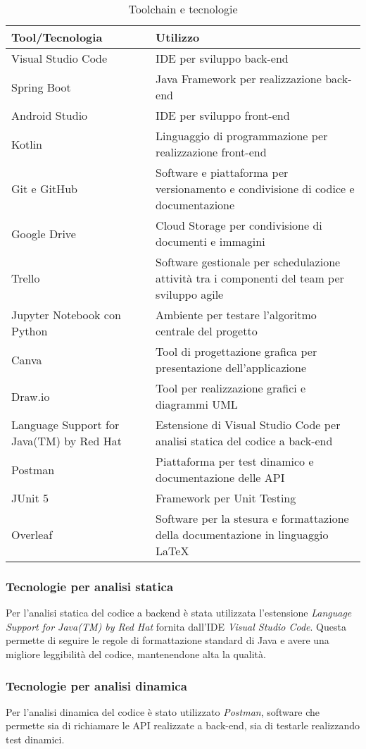 \begin{table}[htbp]
 \centering
 \begin{tabularx}{\textwidth}{| >{\raggedright\arraybackslash}X | >{\raggedright\arraybackslash}X |} 
 \hline
 \textbf{Tool/Tecnologia} & \textbf{Utilizzo} \\ [0.5ex]
 \hline\hline
Visual Studio Code & IDE per sviluppo back-end \\
\hline
Spring Boot & Java Framework per realizzazione back-end\\
\hline
Android Studio & IDE per sviluppo front-end \\
\hline
Kotlin & Linguaggio di programmazione per realizzazione front-end \\
\hline
Git e GitHub & Software e piattaforma per versionamento e condivisione di codice e documentazione \\
\hline
Google Drive & Cloud Storage per condivisione di documenti e immagini \\
\hline
Trello & Software gestionale per schedulazione attività tra i componenti del team per sviluppo agile\\
\hline
Jupyter Notebook con Python & Ambiente per testare l'algoritmo centrale del progetto\\
\hline
Canva & Tool di progettazione grafica per presentazione dell'applicazione \\
\hline
Draw.io & Tool per realizzazione grafici e diagrammi UML \\
\hline
Language Support for Java(TM) by Red Hat & Estensione di Visual Studio Code per analisi statica del codice a back-end \\
\hline
Postman & Piattaforma per test dinamico e documentazione delle API \\
\hline
JUnit 5 & Framework per Unit Testing \\
\hline
Overleaf & Software per la stesura e formattazione della documentazione in linguaggio LaTeX \\
\hline
\end{tabularx}
\caption{Toolchain e tecnologie}
\label{Toolchain e tecnologie}
\end{table}

\subsubsection{Tecnologie per analisi statica} \label{analisi-statica}

Per l'analisi statica del codice a backend è stata utilizzata l'estensione \textit{Language Support for Java(TM) by Red Hat} fornita
dall'IDE \textit{Visual Studio Code}.
Questa permette di seguire le regole di formattazione standard di Java e avere una migliore leggibilità del codice, mantenendone
alta la qualità.

\subsubsection{Tecnologie per analisi dinamica}
Per l'analisi dinamica del codice è stato utilizzato \textit{Postman}, software che permette sia di richiamare le API realizzate a back-end, sia di testarle realizzando test dinamici.
\clearpage
